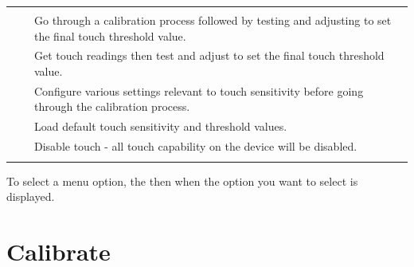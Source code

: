 \begin{table}[H]
\begin{tabu} { X[1,c,m] | X[1,c,m] | X[4,l,m] }
  \thrule
   &  &  \\ \mrule
   &  & Go through a calibration process followed by testing
    and adjusting to set the final touch threshold value. \\ 
   &  & Get touch readings 
    then test and adjust to set the final touch threshold value. \\ 
   &  & Configure various settings relevant to touch
    sensitivity before going through the calibration process. \\ 
   &  & Load default touch sensitivity and
    threshold values. \\ 
   &  & Disable touch - all touch capability on the
    device will be disabled. \\
  \bhrule
\end{tabu}
\end{table}

To select a menu option,  the  then  when the option you
want to select is displayed.


\section{Calibrate} \label{Touch Calibration} 

